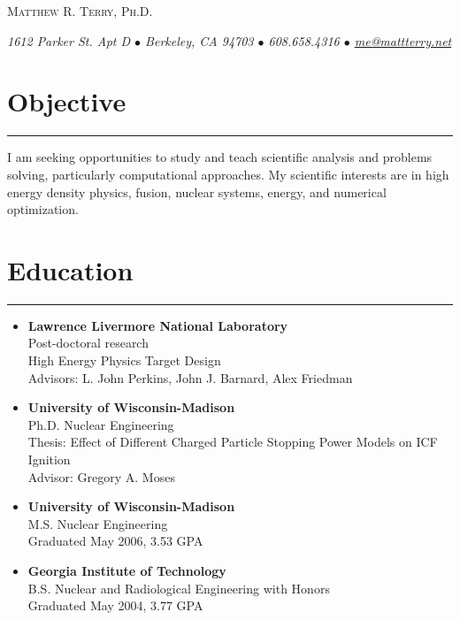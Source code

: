 \documentclass[letterpaper,10pt]{article}
\def\name{Matthew R. Terry, Ph.D.}
\begin{document}
\begin{center}
	{\huge\scshape \name}

	\textit{%
		1612 Parker St. Apt D $\bullet$
		Berkeley, CA 94703 $\bullet$
		608.658.4316 $\bullet$
		\href{mailto:matt.terry@gmail.com}{me@mattterry.net}
	}
\end{center}

\section*{Objective}
\hrule
\vspace{0.07in}
I am seeking opportunities to study and teach scientific analysis and problems
solving, particularly computational approaches.  My scientific interests are in
high energy density physics, fusion, nuclear systems, energy, and numerical
optimization.



\section*{Education}
\hrule
\vspace{0.07in}
\begin{itemize}
	\item
		\textbf{Lawrence Livermore National Laboratory} \\
		Post-doctoral research \\
		High Energy Physics Target Design \\
		Advisors: L. John Perkins, John J. Barnard, Alex Friedman
	\item 
		\textbf{University of Wisconsin-Madison} \\
		Ph.D. Nuclear Engineering \\
  		Thesis: Effect of Different Charged Particle Stopping Power Models on ICF Ignition \\
		Advisor: Gregory A. Moses
	\item 
		\textbf{University of Wisconsin-Madison} \\
		M.S. Nuclear Engineering \\
		Graduated May 2006, 3.53 GPA 
	\item 
		\textbf{Georgia Institute of Technology} \\
		B.S. Nuclear and Radiological Engineering with Honors \\
		Graduated May 2004, 3.77 GPA
\end{itemize}
\end{document}
